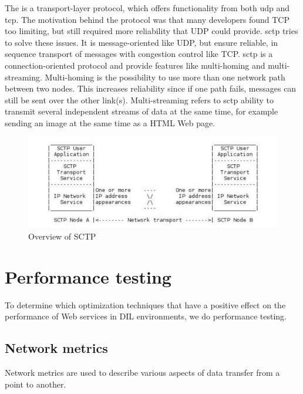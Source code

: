 The  is a transport-layer protocol, which offers
functionality from both \gls{udp} and \gls{tcp}\cite{rfc-sctp}. The motivation
behind the protocol was that many developers found TCP too limiting, but still
required more reliability that UDP could provide. \gls{sctp} tries to solve
these issues. It is message-oriented like UDP, but ensure reliable, in sequence
transport of messages with congestion control like TCP. \gls{sctp} is a
connection-oriented protocol and provide features like multi-homing and
multi-streaming. Multi-homing is the possibility to use more than one network
path between two nodes. This increases reliability since if one path fails,
messages can still be sent over the other link(s). Multi-streaming refers to
\gls{sctp} ability to transmit several independent streams of data at the same
time, for example sending an image at the same time as a HTML Web page.

\begin{figure}[h]
\includegraphics[scale=0.5]{images/sctp.pdf}
\caption{Overview of SCTP}
\end{figure}

\section{Performance testing}

To determine which optimization techniques that have a positive effect on the
performance of Web services in DIL environments, we do performance testing.

\subsection{Network metrics}

Network metrics are used to describe various aspects of data transfer from a
point to another.

